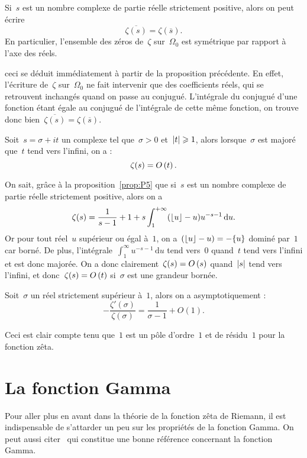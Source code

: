 		\begin{coro}	\label{coro:symetriHZeroZeta}
			Si~$s$ est un nombre complexe de partie réelle strictement positive, alors on peut écrire
			\[
				\overline{\zeta(s)}=\zeta(\overline{s}).
			\]
			En particulier, l'ensemble des zéros de~$\zeta$ sur~$\Omega_0$ est symétrique par rapport à l'axe des réels.
		\end{coro}
		\begin{dem}
			ceci se déduit immédiatement à partir de la proposition précédente. En effet, l'écriture de~$\zeta$ sur~$\Omega_0$ ne fait intervenir que des coefficients réels, qui se retrouvent inchangés quand on passe au conjugué. L'intégrale du conjugué d'une fonction étant égale au conjugué de l'intégrale de cette même fonction, on trouve donc bien~$\overline{\zeta(s)}=\zeta(\overline{s})$.
		\end{dem}
		\begin{prop}\label{prop:tP6}
			Soit~$s=\sigma+it$ un complexe tel que~$\sigma> 0$ et~$\left\vert t\right\vert\geqslant 1$, alors lorsque~$\sigma$ est majoré que~$t$ tend vers l'infini, on a :
			\[
				\zeta(s) = O\left(t\right).
			\]
		\end{prop}
		\begin{dem}
			On sait, grâce à la proposition~\ref{prop:P5} que si~$s$ est un nombre complexe de partie réelle strictement positive, alors on a
			\[
				\zeta(s) = \frac{1}{s-1} + 1 + s\int_{1}^{+\infty} (\lfloor u\rfloor-u)u^{-s-1}\,\mathrm{d}u.
			\]
			Or pour tout réel~$u$ supérieur ou égal à~$1$, on a~$(\lfloor u\rfloor-u) = - \{u\}$ dominé par~$1$ car borné. De plus, l'intégrale~$\int_{1}^{\infty} u^{-s-1}\,\mathrm{d}u$ tend vers~$0$ quand~$t$ tend vers l'infini et est donc majorée. On a donc clairement~$\zeta(s)=O\left(s\right)$ quand~$\left\vert s\right\vert$ tend vers l'infini, et donc~$\zeta(s)=O\left(t\right)$ si~$\sigma$ est une grandeur bornée.
		\end{dem}
		\begin{lem}\label{lem:tL2}
			Soit~$\sigma$ un réel strictement supérieur à~$1$, alors on a asymptotiquement :
			\[
				-\frac{\zeta'(\sigma)}{\zeta(\sigma)} = \frac{1}{\sigma-1} + O(1).
			\]
		\end{lem}
		\begin{dem}
			Ceci est clair compte tenu que~$1$ est un pôle d'ordre~$1$ et de résidu~$1$ pour la fonction zêta.
		\end{dem}
\section{La fonction Gamma}
	Pour aller plus en avant dans la théorie de la fonction zêta de Riemann, il est indispensable de s'attarder un peu sur les propriétés de la fonction Gamma. On peut aussi citer~\cite{GammaGaud} qui constitue une bonne référence concernant la fonction Gamma.
